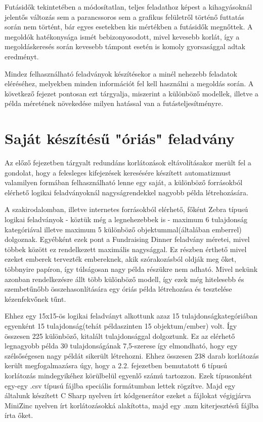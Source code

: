 \documentclass[12pt,a4paper,twoside, openright]{report}
\begin{document}
    Futásidők tekintetében a módosítatlan, teljes feladathoz képest a kihagyásoknál jelentős változás sem a parancssoros sem a grafikus felületről történő futtatás során nem történt, bár egyes esetekben kis mértékben a futásidők megnőttek.
    A megoldók hatékonysága ismét bebizonyosodott, mivel kevesebb korlát, így a megoldáskeresés során kevesebb támpont esetén is komoly gyorsasággal adtak eredményt.
    
    Mindez felhasználható feladványok készítésekor a minél nehezebb feladatok eléréséhez, melyekben minden információt fel kell használni a megoldás során. A következő fejezet pontosan ezt tárgyalja, miszerint a különböző modellek, illetve a példa méretének növekedése milyen hatással van a futásteljesítményre.
    
    \chapter{Saját készítésű "óriás" feladvány}
    
    Az előző fejezetben tárgyalt redundáns korlátozások eltávolításakor merült fel a gondolat, hogy a felesleges kifejezések keresésére készített automatizmust valamilyen formában felhasználható lenne egy saját, a különböző forrásokból elérhető logikai feladványoknál nagyságrendekkel nagyobb példa létrehozására.
    
    A szakirodalomban, illetve internetes forrásokból elérhető, főként Zebra típusú logikai feladványok - köztük még a legnehezebbek is - maximum 6 tulajdonság kategóriával illetve maximum 5 különböző objektummal(általában emberrel) dolgoznak. Egyébként ezek pont a Fundraising Dinner feladvány méretei, mivel többek között ez rendelkezett maximális nagysággal. Ez részben érthető mivel ezeket emberek tervezték embereknek, akik szórakozásból oldják meg őket, többnyire papíron, így túlságosan nagy példa részükre nem adható. Mivel nekünk azonban rendelkezésre állt több különböző modell, így ezek még hitelesebb és szembetűnőbb összehasonlítására egy óriás példa létrehozása és tesztelése kézenfekvőnek tűnt.
    
    Ehhez egy 15x15-ös logikai feladványt alkottunk azaz 15 tulajdonságkategóriában egyenként 15 tulajdonság(tehát példaszinten 15 objektum/ember) volt. Így összesen 225 különböző, kitalált tulajdonsággal dolgoztunk. Ez az elérhető legnagyobb példa 30 tulajdonságának 7,5-szerese így elmondható, hogy egy szélsőségesen nagy példát sikerült létrehozni. Ehhez összesen 238 darab korlátozás került megfogalmazásra úgy, hogy a 2.2. fejezetben bemutatott 6 típusú korlátozás mindegyikéhez körülbelül egyenlő számú tartozzon. Ezek típusonként egy-egy .csv típusú fájlba speciális formátumban lettek rögzítve. Majd egy általunk készített C Sharp nyelven írt kódgenerátor ezeket a fájlokat végigjárva MiniZinc nyelven írt korlátozásokká alakította, majd egy .mzn kiterjesztésű fájlba írta őket.
    
\end{document}
